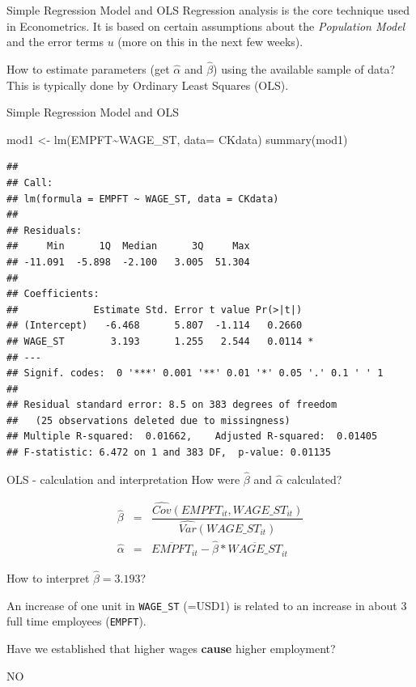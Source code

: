 \documentclass[
  ignorenonframetext,
]{beamer}
\newenvironment{Shaded}{\begin{snugshade}}{\end{snugshade}}
\newcommand{\AttributeTok}[1]{\textcolor[rgb]{0.77,0.63,0.00}{#1}}
\newcommand{\FunctionTok}[1]{\textcolor[rgb]{0.00,0.00,0.00}{#1}}
\newcommand{\NormalTok}[1]{#1}
\newcommand{\OtherTok}[1]{\textcolor[rgb]{0.56,0.35,0.01}{#1}}
\newcommand{\SpecialCharTok}[1]{\textcolor[rgb]{0.00,0.00,0.00}{#1}}
\begin{document}
\begin{frame}{Simple Regression Model and OLS}
\protect\hypertarget{simple-regression-model-and-ols}{}
Regression analysis is the core technique used in Econometrics. It is
based on certain assumptions about the \emph{Population Model} and the
error terms \(u\) (more on this in the next few weeks).

How to estimate parameters (get \(\widehat{\alpha}\) and
\(\widehat{\beta}\)) using the available sample of data? This is
typically done by Ordinary Least Squares (OLS).
\end{frame}

\begin{frame}[fragile]{Simple Regression Model and OLS}
\protect\hypertarget{simple-regression-model-and-ols-1}{}
\footnotesize

\begin{Shaded}
\begin{Highlighting}[]
\NormalTok{mod1 }\OtherTok{\textless{}{-}} \FunctionTok{lm}\NormalTok{(EMPFT}\SpecialCharTok{\textasciitilde{}}\NormalTok{WAGE\_ST, }\AttributeTok{data=}\NormalTok{ CKdata)}
\FunctionTok{summary}\NormalTok{(mod1)}
\end{Highlighting}
\end{Shaded}

\begin{verbatim}
## 
## Call:
## lm(formula = EMPFT ~ WAGE_ST, data = CKdata)
## 
## Residuals:
##     Min      1Q  Median      3Q     Max 
## -11.091  -5.898  -2.100   3.005  51.304 
## 
## Coefficients:
##             Estimate Std. Error t value Pr(>|t|)  
## (Intercept)   -6.468      5.807  -1.114   0.2660  
## WAGE_ST        3.193      1.255   2.544   0.0114 *
## ---
## Signif. codes:  0 '***' 0.001 '**' 0.01 '*' 0.05 '.' 0.1 ' ' 1
## 
## Residual standard error: 8.5 on 383 degrees of freedom
##   (25 observations deleted due to missingness)
## Multiple R-squared:  0.01662,    Adjusted R-squared:  0.01405 
## F-statistic: 6.472 on 1 and 383 DF,  p-value: 0.01135
\end{verbatim}

\normalsize
\end{frame}

\begin{frame}{OLS - calculation and interpretation}
\protect\hypertarget{ols---calculation-and-interpretation}{}
How were \(\widehat{\beta}\) and \(\widehat{\alpha}\) calculated?

\begin{eqnarray*}
  \widehat{\beta}&=&\dfrac{\widehat{Cov}(EMPFT_{it},WAGE\_ST_{it})}{\widehat{Var}(WAGE\_ST_{it})}\\
  \widehat{\alpha}&=&\overline{EMPFT}_{it}-\widehat{\beta}*\overline{WAGE\_ST}_{it}
\end{eqnarray*}

How to interpret \(\widehat{\beta}=3.193\)?

\textcolor{student}{An increase of one unit in \texttt{WAGE\_ST} (=USD1) is related to an increase in about 3 full time employees (\texttt{EMPFT}).}

Have we established that higher wages \textbf{cause} higher employment?

\textcolor{student}{NO}
\end{frame}
\end{document}
